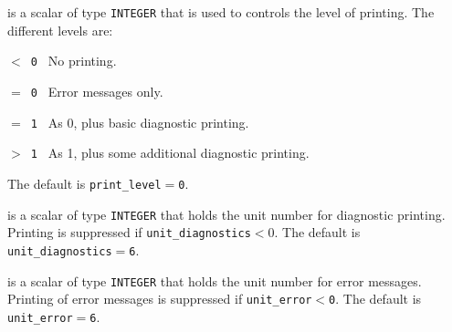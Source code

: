 \documentclass{stfc}
\begin{document}
\begin{description}
 is a scalar of type  {\tt INTEGER}
that is used to controls the level of  printing. The different levels are:
\begin{description}
\item{\tt $<$ 0 } No printing.
\item{\tt $=$ 0 } Error messages only.
\item{\tt $=$ 1 } As 0, plus basic diagnostic printing.
\item{\tt $>$ 1 } As 1, plus some additional diagnostic printing.
\end{description}
The default is {\tt print\_level$=$\tt 0}.

 is a scalar  of type  
{\tt INTEGER} that holds the
unit number for diagnostic printing. Printing is suppressed if 
{\tt unit\_diagnostics$<0$}.
The default is {\tt unit\_diagnostics$=$6}.

 is a scalar of type  {\tt INTEGER} that holds the
unit number for error messages.
Printing of error messages 
is suppressed if {\tt unit\_error$<$0}. 
The default is {\tt unit\_error$=$6}.

\end{description}

\end{document}
